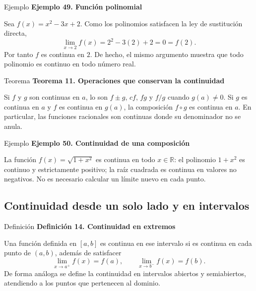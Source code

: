 \documentclass[12pt,aspectratio=169]{beamer}
\newcommand{\R}{\mathbb{R}}
\begin{document}
\begin{frame}[t,allowframebreaks]{Ejemplo}
{\color{azul}\bfseries Ejemplo 49. Función polinomial}\par\medskip

Sea $f(x)=x^2-3x+2$. Como los polinomios satisfacen la ley de sustitución directa,
\[
 \lim_{x\to2}f(x)=2^2-3(2)+2=0=f(2).
\]
Por tanto $f$ es continua en $2$. De hecho, el mismo argumento muestra que todo polinomio es continuo en todo número real.
\end{frame}


\begin{frame}[t,allowframebreaks]{Teorema}
{\color{azul}\bfseries Teorema 11. Operaciones que conservan la continuidad}\par\medskip

Si $f$ y $g$ son continuas en $a$, lo son $f\pm g$, $cf$, $fg$ y $f/g$ cuando $g(a)\ne0$. Si $g$ es continua en $a$ y $f$ es continua en $g(a)$, la composición $f\circ g$ es continua en $a$. En particular, las funciones racionales son continuas donde su denominador no se anula.
\end{frame}


\begin{frame}[t,allowframebreaks]{Ejemplo}
{\color{azul}\bfseries Ejemplo 50. Continuidad de una composición}\par\medskip

La función $f(x)=\sqrt{1+x^2}$ es continua en todo $x\in\R$: el polinomio $1+x^2$ es continuo y estrictamente positivo; la raíz cuadrada es continua en valores no negativos. No es necesario calcular un límite nuevo en cada punto.
\end{frame}


\subsection{Continuidad desde un solo lado y en intervalos}

\begin{frame}[t,allowframebreaks]{Definición}
{\color{azul}\bfseries Definición 14. Continuidad en extremos}\par\medskip

Una función definida en $[a,b]$ es continua en ese intervalo si es continua en cada punto de $(a,b)$, además de satisfacer
\[
 \lim_{x\to a^+}f(x)=f(a),\qquad
 \lim_{x\to b^-}f(x)=f(b).
\]
De forma análoga se define la continuidad en intervalos abiertos y semiabiertos, atendiendo a los puntos que pertenecen al dominio.
\end{frame}
\end{document}
